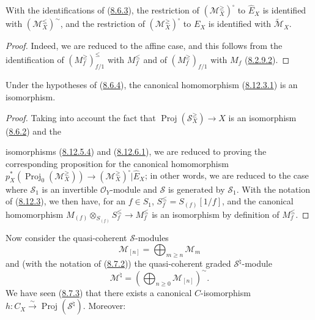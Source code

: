 \begin{corollary}[8.12.7]
\label{II.8.12.7}
With the identifications of (\hyperref[II.8.6.3]{8.6.3}), the restriction
of $(\mathcal{M}_X^{\geq})^{\square}$ to $\widehat{E}_X$ is identified with
$(\mathcal{M}_X^{\leq})^{\sim}$, and the restriction of
$(\mathcal{M}_X^{\geq})^{\square}$ to $E_X$ is identified with
$\widetilde{\mathcal{M}}_X$.
\end{corollary}

\begin{proof}
Indeed, we are reduced to the affine case, and this follows from the
identification of $(M_f^{\geq})_{f/1}^{\leq}$ with $M_f^{\leq}$ and of
$(M_f^{\geq})_{f/1}$ with $M_f$ (\hyperref[II.8.2.9.2]{8.2.9.2}).
\end{proof}

\begin{proposition}[8.12.8]
\label{II.8.12.8}
Under the hypotheses of (\hyperref[II.8.6.4]{8.6.4}), the canonical
homomorphism (\hyperref[II.8.12.3.1]{8.12.3.1}) is an isomorphism.
\end{proposition}

\begin{proof}
Taking into account the fact that $\operatorname{Proj}(\mathcal{S}_X^{\geq})\to X$
is an isomorphism (\hyperref[II.8.6.2]{8.6.2}) and the

isomorphisms (\hyperref[II.8.12.5.4]{8.12.5.4}) and
(\hyperref[II.8.12.6.1]{8.12.6.1}), we are reduced to proving the
corresponding proposition for the canonical homomorphism
$p_X^*(\operatorname{Proj}_0(\mathcal{M}_X^{\geq}))
\to(\mathcal{M}_X^{\geq})^{\square}|\widehat{E}_X$; in other words, we are
reduced to the case where $\mathcal{S}_1$ is an invertible
$\mathcal{O}_Y$-module and $\mathcal{S}$ is generated by $\mathcal{S}_1$.
With the notation of (\hyperref[II.8.12.3]{8.12.3}), we then have, for an
$f\in S_1$, $S_f^{\leq}=S_{(f)}[1/f]$, and the canonical homomorphism
$M_{(f)}\otimes_{S_{(f)}}S_f^{\leq}\to M_f^{\leq}$ is an isomorphism by
definition of $M_f^{\leq}$.
\end{proof}

\begin{env}[8.12.9]
\label{II.8.12.9}
Now consider the quasi-coherent $\mathcal{S}$-modules
\[
  \mathcal{M}_{[n]}=\bigoplus_{m\geqslant n}\mathcal{M}_m
\]
and (with the notation of (\hyperref[II.8.7.2]{8.7.2})) the
quasi-coherent graded $\mathcal{S}^{\natural}$-module
\begin{equation}
\label{II.8.12.9.1}
  \mathcal{M}^{\natural}
  =\left(\bigoplus_{n\geqslant0}\mathcal{M}_{[n]}\right)^{\sim}.
\tag{8.12.9.1}
\end{equation}
We have seen (\hyperref[II.8.7.3]{8.7.3}) that there exists a canonical
$C$-isomorphism
$h:C_X\xrightarrow{\sim}\operatorname{Proj}(\mathcal{S}^{\natural})$.
Moreover:
\end{env}

